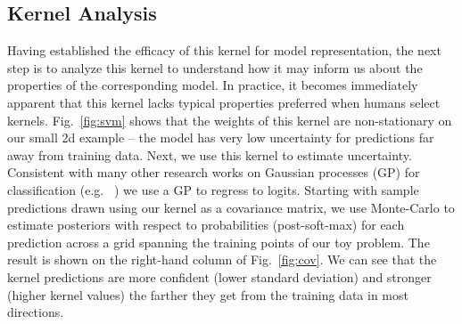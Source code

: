 


\subsection{Kernel Analysis}
Having established the efficacy of this kernel for model
representation, the next step is to analyze this kernel to understand
how it may inform us about the properties of the corresponding
model. In practice, it becomes immediately apparent that this kernel
lacks typical properties preferred when humans select
kernels. Fig.~\ref{fig:svm} shows that the weights of this kernel are
non-stationary on our small 2d example -- the model has very low uncertainty for predictions far away from training data. Next, we use this kernel to estimate uncertainty. Consistent with many other research works on Gaussian processes (GP) for classification (e.g. ~\citet{rasmussen2006gaussian}) we use a GP to regress to logits. Starting with sample predictions drawn using our kernel as a covariance matrix, we use Monte-Carlo to estimate posteriors with respect to probabilities (post-soft-max) for each prediction across a grid spanning the training points of our toy problem. The result is shown on the right-hand column of Fig.~\ref{fig:cov}. We can see that the kernel predictions are more confident (lower standard deviation) and stronger (higher kernel values) the farther they get from the training data in most directions. 

